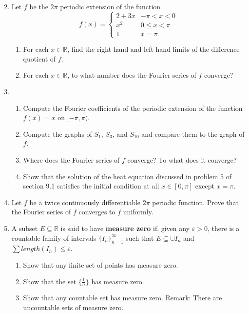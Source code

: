 \documentclass{article}
\begin{document}
\begin{enumerate}
    \setcounter{enumi}{1}
    \item Let $f$ be the $2\pi$ periodic extension of the function
          \[
              f(x) = \begin{cases}
                  2 + 3x & -\pi < x < 0   \\
                  x^2    & 0 \leq x < \pi \\
                  1      & x = \pi
              \end{cases}
          \]
          \begin{enumerate}
              \item For each $x\in\mathbb{R}$, find the right-hand and
                    left-hand limits of the difference quotient of $f$.
              \item For each $x\in\mathbb{R}$, to what number does the
                    Fourier series of $f$ converge?
          \end{enumerate}
          \setcounter{enumi}{4}
    \item \begin{enumerate}
              \item Compute the Fourier coefficients of the periodic extension
                    of the function $f(x)=x$ on $[-\pi,\pi)$.
              \item Compute the graphs of $S_1$, $S_3$, and $S_{10}$ and compare
                    them to the graph of $f$.
              \item Where does the Fourier series of $f$ converge? To what does
                    it converge?
              \item Show that the solution of the heat equation discussed in
                    problem 5 of section 9.1 satisfies the initial condition
                    at all $x\in[0,\pi]$ except $x=\pi$.
          \end{enumerate}
          \setcounter{enumi}{6}
    \item Let $f$ be a twice continuously differentiable $2\pi$ periodic
          function. Prove that the Fourier series of $f$ converges to $f$
          uniformly.
          \setcounter{enumi}{9}
    \item A subset $E\subseteq \mathbb{R}$ is said to have \textbf{measure zero}
          if, given any $\varepsilon>0$, there is a countable family of intervals
          $\{I_n\}_{n=1}^\infty$ such that $E\subseteq\cup I_n$ and
          $\sum length(I_n)\leq \varepsilon$.
          \begin{enumerate}
              \item Show that any finite set of points has measure zero.
              \item Show that the set $\{\frac{1}{n}\}$ has measure zero.
              \item Show that any countable set has measure zero. Remark:
                    There are uncountable sets of measure zero.
          \end{enumerate}
\end{enumerate}
\end{document}
